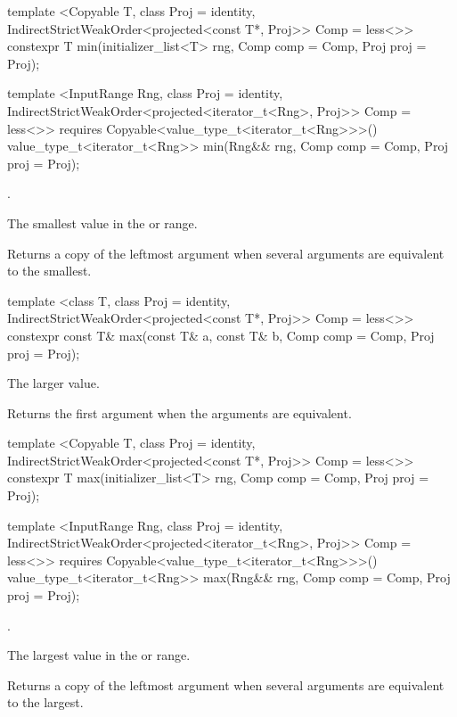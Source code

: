 %
\begin{itemdecl}
template <Copyable T, class Proj = identity,
    IndirectStrictWeakOrder<projected<const T*, Proj>> Comp = less<>>
  constexpr T min(initializer_list<T> rng, Comp comp = Comp{}, Proj proj = Proj{});

template <InputRange Rng, class Proj = identity,
    IndirectStrictWeakOrder<projected<iterator_t<Rng>, Proj>> Comp = less<>>
  requires Copyable<value_type_t<iterator_t<Rng>>>()
  value_type_t<iterator_t<Rng>>
    min(Rng&& rng, Comp comp = Comp{}, Proj proj = Proj{});
\end{itemdecl}

\begin{itemdescr}
\pnum
\requires {}.

\pnum
\returns The smallest value in the  or range.

\pnum
\remarks Returns a copy of the leftmost argument when several arguments are equivalent to the smallest.
\end{itemdescr}

%
\begin{itemdecl}
template <class T, class Proj = identity,
    IndirectStrictWeakOrder<projected<const T*, Proj>> Comp = less<>>
  constexpr const T& max(const T& a, const T& b, Comp comp = Comp{}, Proj proj = Proj{});
\end{itemdecl}

\begin{itemdescr}
\pnum
\returns
The larger value.

\pnum
\notes
Returns the first argument when the arguments are equivalent.
\end{itemdescr}

%
\begin{itemdecl}
template <Copyable T, class Proj = identity,
    IndirectStrictWeakOrder<projected<const T*, Proj>> Comp = less<>>
  constexpr T max(initializer_list<T> rng, Comp comp = Comp{}, Proj proj = Proj{});

template <InputRange Rng, class Proj = identity,
    IndirectStrictWeakOrder<projected<iterator_t<Rng>, Proj>> Comp = less<>>
  requires Copyable<value_type_t<iterator_t<Rng>>>()
  value_type_t<iterator_t<Rng>>
    max(Rng&& rng, Comp comp = Comp{}, Proj proj = Proj{});
\end{itemdecl}

\begin{itemdescr}
\pnum
\requires {}.

\pnum
\returns The largest value in the  or range.

\pnum
\remarks Returns a copy of the leftmost argument when several arguments are equivalent to the largest.
\end{itemdescr}

